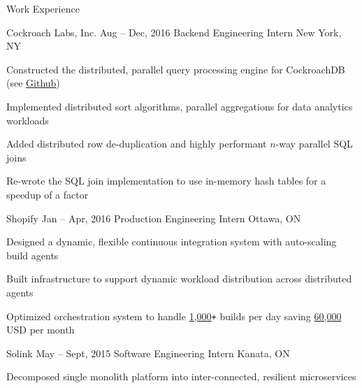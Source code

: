 \documentclass{resume} %
\begin{document}
\begin{rSection}{Work Experience}
  \begin{rSubsection}{Cockroach Labs, Inc.}
                     {Aug -- Dec, 2016}
                     {Backend Engineering Intern}
                     {New York, NY}

    \item Constructed the distributed, parallel query processing engine for
      CockroachDB (see
      \href{https://github.com/cockroachdb/cockroach/pulls?q=is\%3Apr\%20author\%3Airfansharif}{Github})
    \item Implemented distributed sort algorithms, parallel aggregations for
      data analytics workloads
    \item Added distributed row de-duplication and highly performant $n$-way
      parallel SQL joins
    \item Re-wrote the SQL join implementation to use in-memory hash
      tables for a speedup of a factor
  \end{rSubsection}

  \begin{rSubsection}{Shopify}
                     {Jan -- Apr, 2016}
                     {Production Engineering Intern}
                     {Ottawa, ON}

  \item Designed a dynamic, flexible continuous integration system with
    auto-scaling build agents
  \item Built infrastructure to support dynamic workload distribution across
    distributed agents
  \item Optimized orchestration system to handle \underline{1,000}\texttt{+} builds per
    day saving \underline{60,000} USD per month
  \end{rSubsection}

  \begin{rSubsection}{Solink}
                     {May -- Sept, 2015}
                     {Software Engineering Intern}
                     {Kanata, ON}

    \item Decomposed single monolith platform into inter-connected, resilient
      microservices
  \end{rSubsection}
\end{rSection}

\end{document}
